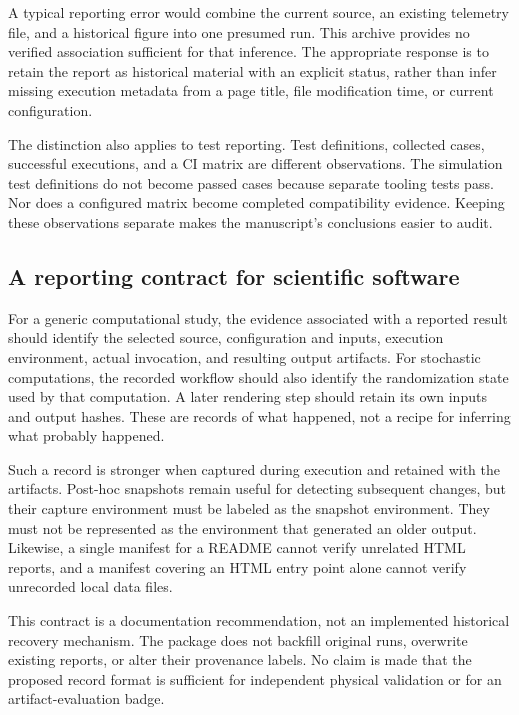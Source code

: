 \documentclass[11pt,a4paper]{article}
\begin{document}
A typical reporting error would combine the current source, an existing telemetry file, and a historical figure into one presumed run. This archive provides no verified association sufficient for that inference. The appropriate response is to retain the report as historical material with an explicit status, rather than infer missing execution metadata from a page title, file modification time, or current configuration.

The distinction also applies to test reporting. Test definitions, collected cases, successful executions, and a CI matrix are different observations. The \SimulationTestDefinitions simulation test definitions do not become passed cases because \TestsPassed separate tooling tests pass. Nor does a configured matrix become completed compatibility evidence. Keeping these observations separate makes the manuscript's conclusions easier to audit.

\subsection{A reporting contract for scientific software}
For a generic computational study, the evidence associated with a reported result should identify the selected source, configuration and inputs, execution environment, actual invocation, and resulting output artifacts. For stochastic computations, the recorded workflow should also identify the randomization state used by that computation. A later rendering step should retain its own inputs and output hashes. These are records of what happened, not a recipe for inferring what probably happened.

Such a record is stronger when captured during execution and retained with the artifacts. Post-hoc snapshots remain useful for detecting subsequent changes, but their capture environment must be labeled as the snapshot environment. They must not be represented as the environment that generated an older output. Likewise, a single manifest for a README cannot verify unrelated HTML reports, and a manifest covering an HTML entry point alone cannot verify unrecorded local data files.

This contract is a documentation recommendation, not an implemented historical recovery mechanism. The package does not backfill original runs, overwrite existing reports, or alter their provenance labels. No claim is made that the proposed record format is sufficient for independent physical validation or for an artifact-evaluation badge.
\end{document}
